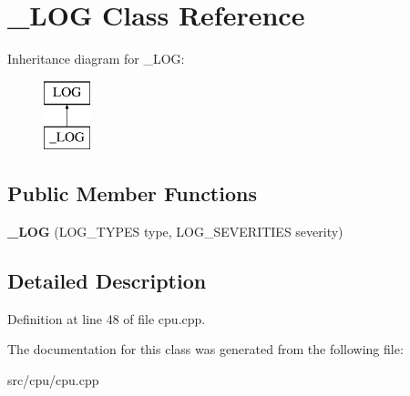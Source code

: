 \hypertarget{class__LOG}{\section{\-\_\-\-L\-O\-G Class Reference}
\label{class__LOG}
}
Inheritance diagram for \-\_\-\-L\-O\-G\-:\begin{figure}[H]
\begin{center}
\leavevmode
\includegraphics[height=2.000000cm]{class__LOG}
\end{center}
\end{figure}
\subsection*{Public Member Functions}
\begin{DoxyCompactItemize}
\item 
\hypertarget{class__LOG_ab6d547f5964f90ac3e7dbbb4cbf46713}{{\bfseries \-\_\-\-L\-O\-G} (L\-O\-G\-\_\-\-T\-Y\-P\-E\-S type, L\-O\-G\-\_\-\-S\-E\-V\-E\-R\-I\-T\-I\-E\-S severity)}\label{class__LOG_ab6d547f5964f90ac3e7dbbb4cbf46713}

\end{DoxyCompactItemize}


\subsection{Detailed Description}


Definition at line 48 of file cpu.\-cpp.



The documentation for this class was generated from the following file\-:\begin{DoxyCompactItemize}
\item 
src/cpu/cpu.\-cpp\end{DoxyCompactItemize}
